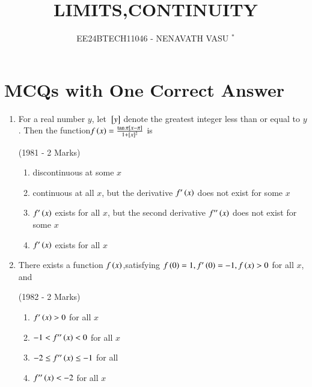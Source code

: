 \documentclass[journal,12pt,onecolumn]{IEEEtran}
\theoremstyle{remark}
\begin{document}

\vspace{3cm}

\title{LIMITS,CONTINUITY}
\author{EE24BTECH11046 - NENAVATH VASU $^{*}$%
}
\maketitle
\bigskip

\renewcommand{\thefigure}{\theenumi}
\renewcommand{\thetable}{\theenumi}


\section{ MCQs with One Correct Answer}



\begin{enumerate}
   
\item For a real number $y$, let ${}\left[y\right]$ denote the greatest integer less than or equal to $y$. Then the function{$f\left(x\right)=\frac{\tan\pi{}\left[x-\pi\right]}{1+[x]^2}$} is

	\hfill                    {(1981 - 2 Marks)}
   \begin{enumerate}
       \item discontinuous at some $x$
       \item continuous at all $x$, but the derivative $f^{\prime}\left(x\right)$ does not exist for some $x$
       \item $f^{\prime}\left(x\right)$ exists for all $x$, but the second derivative $f^{\prime\prime}\left(x\right)$ does not exist for some $x$
        \item $f^{\prime}\left(x\right)$ exists for all $x$
   \end{enumerate}




\item There exists a function $f\left(x\right)$,satisfying $f\left(0\right)=1, f^{\prime}\left(0\right)=-1, f\left(x\right)>0$ for all $x$, and 

	\hfill      {(1982 - 2 Marks)}
		\begin{multicols}{2}		
    \begin{enumerate}

          \item $f^{\prime}\left(x\right) > 0$ for all $x$
          \item$ -1 < f^{\prime\prime}\left(x\right) < 0$ for all $x$
          \item $-2 \leq f^{\prime\prime}\left(x\right) \leq -1$ for  all 
          \item $f^{\prime\prime}\left(x\right) < -2$ for all $x$


\end{enumerate}
\end{multicols}
\end{enumerate}
\end{document}
